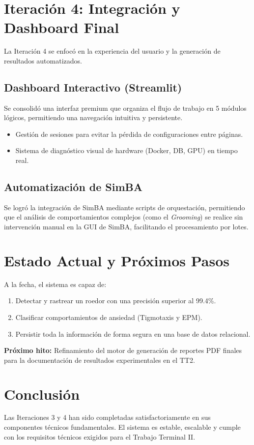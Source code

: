 \documentclass[12pt,a4paper]{article}
\begin{document}
\section{Iteración 4: Integración y Dashboard Final}
La Iteración 4 se enfocó en la experiencia del usuario y la generación de resultados automatizados.

\subsection{Dashboard Interactivo (Streamlit)}
Se consolidó una interfaz premium que organiza el flujo de trabajo en 5 módulos lógicos, permitiendo una navegación intuitiva y persistente.
\begin{itemize}
    \item Gestión de sesiones para evitar la pérdida de configuraciones entre páginas.
    \item Sistema de diagnóstico visual de hardware (Docker, DB, GPU) en tiempo real.
\end{itemize}

\subsection{Automatización de SimBA}
Se logró la integración de SimBA mediante scripts de orquestación, permitiendo que el análisis de comportamientos complejos (como el \textit{Grooming}) se realice sin intervención manual en la GUI de SimBA, facilitando el procesamiento por lotes.

\section{Estado Actual y Próximos Pasos}
A la fecha, el sistema es capaz de:
\begin{enumerate}
    \item Detectar y rastrear un roedor con una precisión superior al 99.4\%.
    \item Clasificar comportamientos de ansiedad (Tigmotaxis y EPM).
    \item Persistir toda la información de forma segura en una base de datos relacional.
\end{enumerate}

\textbf{Próximo hito:} Refinamiento del motor de generación de reportes PDF finales para la documentación de resultados experimentales en el TT2.

\section{Conclusión}
Las Iteraciones 3 y 4 han sido completadas satisfactoriamente en sus componentes técnicos fundamentales. El sistema es estable, escalable y cumple con los requisitos técnicos exigidos para el Trabajo Terminal II.
\end{document}
